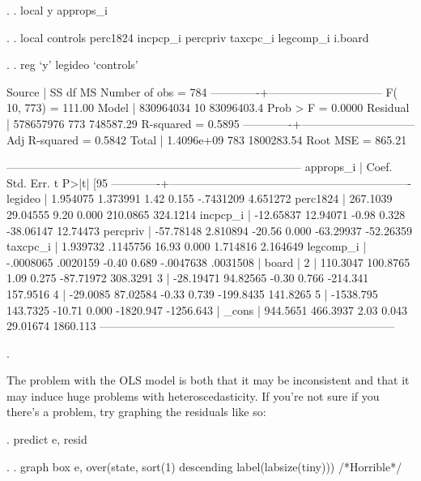 \documentclass[12pt]{article}
\begin{document}
\begin{stlog}
  . 
. local y approps_i

. 
. local controls perc1824 incpcp_i percpriv taxcpc_i  legcomp_i i.board 

. 
. reg `y'  legideo `controls'

      Source |       SS       df       MS              Number of obs =     784
-------------+------------------------------           F( 10,   773) =  111.00
       Model |   830964034    10  83096403.4           Prob > F      =  0.0000
    Residual |   578657976   773   748587.29           R-squared     =  0.5895
-------------+------------------------------           Adj R-squared =  0.5842
       Total |  1.4096e+09   783  1800283.54           Root MSE      =  865.21

------------------------------------------------------------------------------
   approps_i |      Coef.   Std. Err.      t    P>|t|     [95%
-------------+----------------------------------------------------------------
     legideo |   1.954075   1.373991     1.42   0.155    -.7431209    4.651272
    perc1824 |   267.1039   29.04555     9.20   0.000     210.0865    324.1214
    incpcp_i |  -12.65837   12.94071    -0.98   0.328    -38.06147    12.74473
    percpriv |  -57.78148   2.810894   -20.56   0.000    -63.29937   -52.26359
    taxcpc_i |   1.939732   .1145756    16.93   0.000     1.714816    2.164649
   legcomp_i |  -.0008065   .0020159    -0.40   0.689    -.0047638    .0031508
             |
       board |
          2  |   110.3047   100.8765     1.09   0.275    -87.71972    308.3291
          3  |  -28.19471   94.82565    -0.30   0.766     -214.341    157.9516
          4  |   -29.0085   87.02584    -0.33   0.739    -199.8435    141.8265
          5  |  -1538.795   143.7325   -10.71   0.000    -1820.947   -1256.643
             |
       _cons |   944.5651   466.3937     2.03   0.043     29.01674    1860.113
------------------------------------------------------------------------------

. 
\end{stlog}


The problem with the OLS model is both that it may be inconsistent and
that it may induce huge problems with heteroscedasticity. If you're
not sure if you there's a problem, try graphing the residuals like so: 


\begin{stlog}
  . predict e, resid

. 
. graph box e, over(state, sort(1) descending label(labsize(tiny))) /*Horrible*/

\end{stlog}
\end{document}
